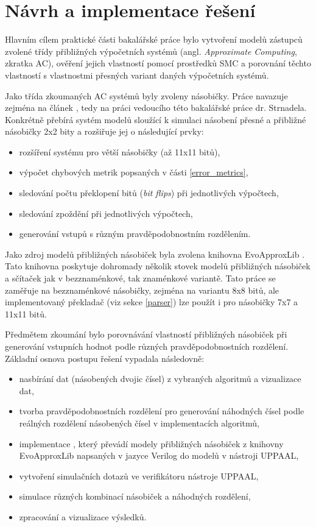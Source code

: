 \chapter{Návrh a implementace řešení}
\label{rozbor}
Hlavním cílem praktické části bakalářské práce bylo vytvoření modelů zástupců zvolené třídy přibližných výpočetních systémů (angl. \textit{Approximate Computing}, zkratka AC), ověření jejich vlastností pomocí prostředků SMC a porovnání těchto vlastností s vlastnostmi přesných variant daných výpočetních systémů.

Jako třída zkoumaných AC systémů byly zvoleny násobičky. Práce navazuje zejména na článek \cite{smc_axc}, tedy na práci vedoucího této bakalářské práce dr. Strnadela. Konkrétně přebírá systém modelů sloužící k simulaci násobení přesné a přibližné násobičky 2x2 bity a rozšiřuje jej o následující prvky:
\begin{itemize}
    \item rozšíření systému pro větší násobičky (až 11x11 bitů),
    \item výpočet chybových metrik popsaných v části \ref{error_metrics},
    \item sledování počtu překlopení bitů (\textit{bit flips}) při jednotlivých výpočtech,
    \item sledování zpoždění při jednotlivých výpočtech,
    \item generování vstupů s různým pravděpodobnostním rozdělením.
\end{itemize}

Jako zdroj modelů přibližných násobiček byla zvolena knihovna EvoApproxLib \cite{circuit_library}. Tato knihovna poskytuje dohromady několik stovek modelů přibližných násobiček a sčítaček jak v bezznaménkové, tak znaménkové variantě. Tato práce se zaměřuje na bezznaménkové násobičky, zejména na variantu 8x8 bitů, ale implementovaný překladač (viz sekce \ref{parser}) lze použít i pro násobičky 7x7 a 11x11 bitů.

\bigskip

Předmětem zkoumání bylo porovnávání vlastností přibližných násobiček při generování vstupních hodnot podle různých pravděpodobnostních rozdělení. Základní osnova postupu řešení vypadala následovně:

\begin{itemize}
    \item nasbírání dat (násobených dvojic čísel) z vybraných algoritmů a vizualizace dat,
    \item tvorba pravděpodobnostních rozdělení pro generování náhodných čísel podle reálných rozdělení násobených čísel v implementacích algoritmů,
    \item implementace , který převádí modely přibližných násobiček z knihovny EvoApproxLib \cite{circuit_library} napsaných v jazyce Verilog do modelů v nástroji UPPAAL,
    \item vytvoření simulačních dotazů ve verifikátoru nástroje UPPAAL,
    \item simulace různých kombinací násobiček a náhodných rozdělení, 
    \item zpracování a vizualizace výsledků.
\end{itemize}

